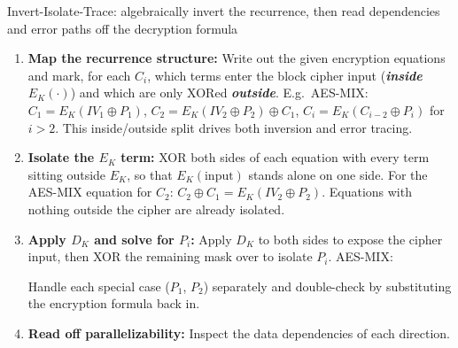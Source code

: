 \documentclass[12pt, a4paper]{article}
\newcommand{\term}[1]{\textbf{\textit{#1}}}        %
\begin{document}
\begin{schemebox}{Invert-Isolate-Trace: algebraically invert the recurrence, then read dependencies and error paths off the decryption formula}
\begin{enumerate}[label=\textbf{Step \arabic*:}, leftmargin=*]
    \item \textbf{Map the recurrence structure:} Write out the given encryption equations and mark, for each $C_i$, which terms enter the block cipher input (\term{inside} $E_K(\cdot)$) and which are only XORed \term{outside}.
    E.g.\ AES-MIX: $C_1 = E_K(IV_1 \oplus P_1)$, $C_2 = E_K(IV_2 \oplus P_2) \oplus C_1$, $C_i = E_K(C_{i-2} \oplus P_i)$ for $i > 2$. This inside/outside split drives both inversion and error tracing.
    \item \textbf{Isolate the $E_K$ term:} XOR both sides of each equation with every term sitting outside $E_K$, so that $E_K(\text{input})$ stands alone on one side. For the AES-MIX equation for $C_2$: $C_2 \oplus C_1 = E_K(IV_2 \oplus P_2)$. Equations with nothing outside the cipher are already isolated.
    \item \textbf{Apply $D_K$ and solve for $P_i$:} Apply $D_K$ to both sides to expose the cipher input, then XOR the remaining mask over to isolate $P_i$. AES-MIX:
    Handle each special case ($P_1$, $P_2$) separately and double-check by substituting the encryption formula back in.
    \item \textbf{Read off parallelizability:} Inspect the data dependencies of each direction.
\end{enumerate}
\end{schemebox}
\end{document}
